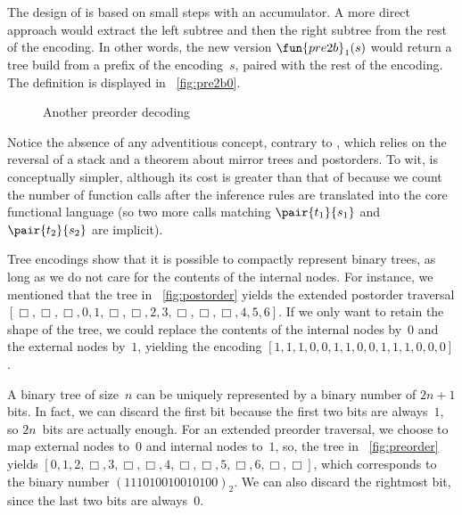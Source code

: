 The design of  is based on
small steps with an accumulator. A more direct approach would extract
the left subtree and then the right subtree from the rest of the
encoding. In other words, the new version
\(\fun{pre2b}_1(s)\) would return a
tree build from a prefix of the encoding~\(s\), paired with the rest
of the encoding. The definition is displayed in
\fig~\vref{fig:pre2b0}.
\begin{figure}[b]
\abovedisplayskip=0pt
\belowdisplayskip=0pt
\centering
{}
\caption{Another preorder decoding}
\label{fig:pre2b0}
\end{figure}
Notice the absence of any adventitious concept, contrary to
, which relies on the
reversal of a stack and a theorem about mirror
trees and postorders. To wit,
 is conceptually
simpler, although its cost is greater than that of
 because we count the number
of function calls after the inference rules
are translated into the core functional language (so two more calls
matching \(\pair{t_1}{s_1}\) and \(\pair{t_2}{s_2}\) are implicit).

Tree encodings show that it is possible to compactly represent binary
trees, as long as we do not care for the contents of the internal
nodes. For instance, we mentioned that the tree in
\fig~\vref{fig:postorder} yields the extended postorder traversal \([\Box, \Box, \Box, 0, 1, \Box,
\Box, 2, 3, \Box, \Box, \Box, 4, 5, 6]\). If we only want to retain
the shape of the tree, we could replace the contents of the internal
nodes by~\(0\) and the external nodes by~\(1\), yielding the encoding
\([1,1,1,0,0,1,1,0,0,1,1,1,0,0,0]\).

A binary tree of size~\(n\) can be uniquely represented by a binary
number of \(2n+1\) bits. In fact, we can discard the first bit because
the first two bits are always~\(1\), so \(2n\)~bits are actually
enough. For an extended preorder traversal, we choose to map external
nodes to~\(0\) and internal nodes to~\(1\), so, the tree in
\fig~\vref{fig:preorder} yields \([0, 1, 2, \Box, 3, \Box, \Box, 4,
  \Box, \Box, 5, \Box, 6, \Box, \Box]\), which corresponds to the
binary number \((111010010010100)_2\). We can also discard the
rightmost bit, since the last two bits are always~\(0\).

